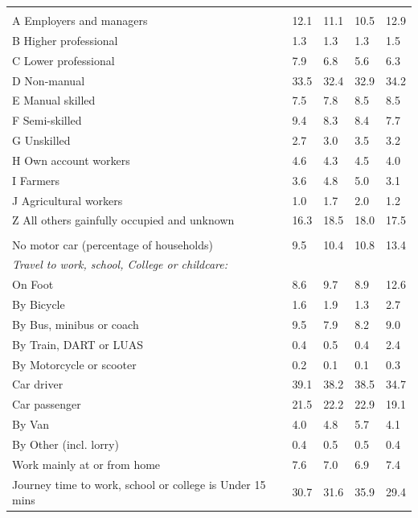 \documentclass{article}
\begin{document}
\begin{table}[h]
\begin{tabular}{KTTTT}
\hline
    \\ 
    \hline
A Employers and managers & 12.1& 11.1& 10.5& 12.9\\
B Higher professional & 1.3& 1.3& 1.3& 1.5\\
C Lower professional & 7.9& 6.8& 5.6& 6.3\\
D Non-manual & 33.5& 32.4& 32.9& 34.2\\
E Manual skilled & 7.5& 7.8& 8.5& 8.5\\
F Semi-skilled & 9.4& 8.3& 8.4& 7.7\\
G Unskilled & 2.7& 3.0& 3.5& 3.2\\
H Own account workers & 4.6& 4.3& 4.5& 4.0\\
I Farmers & 3.6& 4.8& 5.0& 3.1\\
J Agricultural workers & 1.0& 1.7& 2.0& 1.2\\
Z All others gainfully occupied and unknown & 16.3& 18.5& 18.0& 17.5\\
\hline
{}\hline
    \\ 
    \hline
No motor car (percentage of households) &  9.5& 10.4& 10.8& 
13.4\\
    \hline 
\emph{Travel to work, school, College or childcare:} & & & \\
\quad On Foot &  8.6&  9.7&  8.9& 12.6\\ 
\quad By Bicycle & 1.6& 1.9& 1.3& 2.7\\ 
\quad By Bus, minibus or coach & 9.5& 7.9& 8.2& 9.0\\
\quad By Train, DART or LUAS & 0.4& 0.5& 0.4& 2.4\\
\quad By Motorcycle or scooter & 0.2& 0.1& 0.1& 0.3\\
\quad Car driver & 39.1 & 38.2& 38.5& 34.7\\
\quad Car passenger & 21.5& 22.2& 22.9& 19.1\\
\quad By Van & 4.0& 4.8& 5.7& 4.1\\
\quad By Other (incl. lorry) & 0.4& 0.5& 0.5& 0.4\\
    \hline
Work mainly at or from home & 7.6& 7.0& 6.9& 7.4\\
Journey time to work, school or college is Under 15 mins & 30.7& 31.6& 35.9& 29.4\\

\end{tabular}
\end{table}
\end{document}
